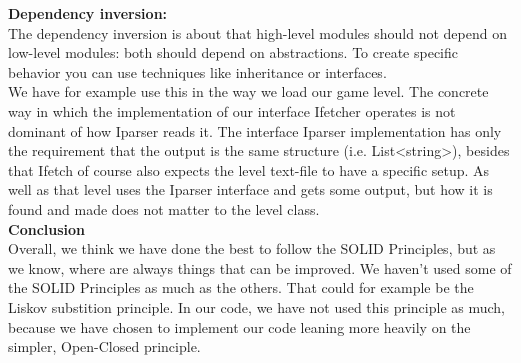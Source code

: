 \documentclass[../master.tex]{subfiles}
\begin{document}
\noindent\textbf{Dependency inversion:}\\
The dependency inversion is about that high-level modules should not depend on low-level modules: both should depend on abstractions. To create specific behavior you can use techniques like inheritance or interfaces.\\

\noindent We have for example use this in the way we load our game level. The concrete way in which the implementation of our interface Ifetcher operates is not dominant of how Iparser reads it. The interface Iparser implementation has only the requirement that the output is the same structure (i.e. List<string>), besides that Ifetch of course also expects the level text-file to have a specific setup. As well as that level uses the Iparser interface and gets some output, but how it is found and made does not matter to the level class.\\

\noindent\textbf{Conclusion}\\
Overall, we think we have done the best to follow the SOLID Principles, but as we know, where are always things that can be improved. We haven't used some of the SOLID Principles as much as the others. That could for example be the Liskov substition principle. In our code, we have not used this principle as much, because we have chosen to implement our code leaning more heavily on the simpler, Open-Closed principle.
\end{document}
